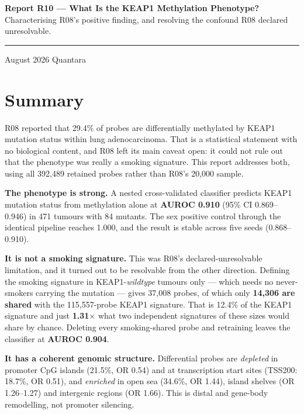 \documentclass[11pt,a4paper]{article}
\begin{document}
\thispagestyle{empty}
\noindent
{\large\bfseries\color{qnavy} Report R10 --- What Is the KEAP1 Methylation Phenotype?}\\[2pt]
{\color{qgrey}Characterising R08's positive finding, and resolving the confound R08 declared
unresolvable.}\\[6pt]
{\color{qgrey}\rule{\textwidth}{0.4pt}}

\medskip
{} August 2026 \quad\textbullet\quad Quantara

\section*{Summary}

R08 reported that 29.4\% of probes are differentially methylated by KEAP1 mutation status within
lung adenocarcinoma. That is a statistical statement with no biological content, and R08 left
its main caveat open: it could not rule out that the phenotype was really a smoking signature.
This report addresses both, using all 392{,}489 retained probes rather than R08's 20{,}000
sample.

\textbf{The phenotype is strong.} A nested cross-validated classifier predicts KEAP1 mutation
status from methylation alone at \textbf{AUROC 0.910} (95\% CI 0.869--0.946) in 471 tumours with
84 mutants. The sex positive control through the identical pipeline reaches 1.000, and the result
is stable across five seeds (0.868--0.910).

\textbf{It is not a smoking signature.} This was R08's declared-unresolvable limitation, and it
turned out to be resolvable from the other direction. Defining the smoking signature in
KEAP1-\emph{wildtype} tumours only --- which needs no never-smokers carrying the mutation ---
gives 37{,}008 probes, of which only \textbf{14{,}306 are shared} with the 115{,}557-probe KEAP1
signature. That is 12.4\% of the KEAP1 signature and just \textbf{1.31$\times$} what two
independent signatures of these sizes would share by chance. Deleting every smoking-shared probe
and retraining leaves the classifier at \textbf{AUROC 0.904}.

\textbf{It has a coherent genomic structure.} Differential probes are \emph{depleted} in promoter
CpG islands (21.5\%, OR 0.54) and at transcription start sites (TSS200: 18.7\%, OR 0.51), and
\emph{enriched} in open sea (34.6\%, OR 1.44), island shelves (OR 1.26--1.27) and intergenic
regions (OR 1.66). This is distal and gene-body remodelling, not promoter silencing.
\end{document}
